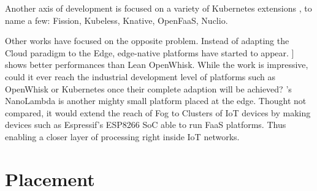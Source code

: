 \documentclass[11pt]{sdm}
\begin{document}
Another axis of development is focused on a variety of Kubernetes extensions \cite{bocci_secure_2021}, to name a few: Fission, Kubeless, Knative, OpenFaaS, Nuclio.


Other works have focused on the opposite problem. Instead of adapting the Cloud paradigm to the Edge, edge-native platforms have started to appear. \citet{pfandzelter_tinyfaas_2020}] shows better performances than Lean OpenWhisk. While the work is impressive, could it ever reach the industrial development level of platforms such as OpenWhisk or Kubernetes once their complete adaption will be achieved? 's NanoLambda is another mighty small platform placed at the edge. Thought not compared, it would extend the reach of Fog to Clusters of IoT devices by making devices such as Espressif's ESP8266 \gls{SoC} \cite{noauthor_esp8266_nodate} able to run \gls{FaaS} platforms. Thus enabling a closer layer of processing right inside IoT networks.


\section{Placement}
\end{document}
